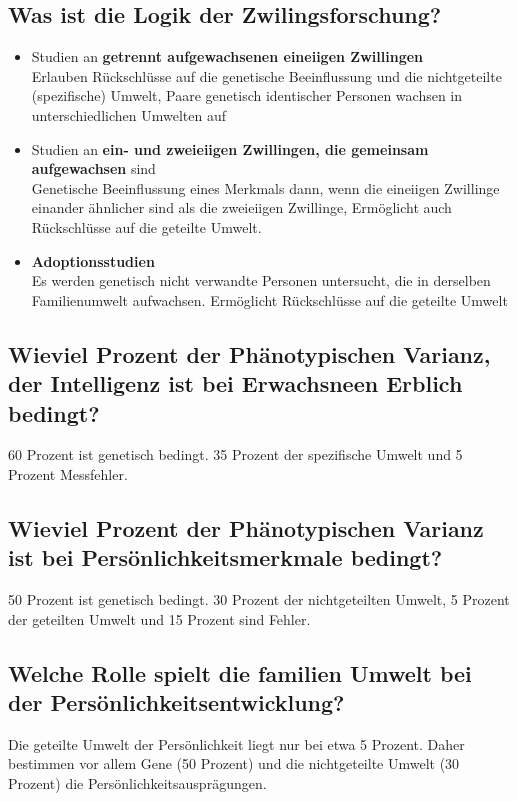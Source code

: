\documentclass[a6paper,10pt,DIV=40]{scrartcl}
\begin{document}
\subsection{Was ist die Logik der Zwilingsforschung?}
\begin{itemize}
\item Studien an \textbf{getrennt aufgewachsenen eineiigen Zwillingen}\\
Erlauben Rückschlüsse auf die genetische Beeinflussung und die nichtgeteilte
(spezifische) Umwelt, Paare genetisch identischer Personen wachsen in unterschiedlichen Umwelten auf

\item Studien an \textbf{ein- und zweieiigen Zwillingen, die gemeinsam aufgewachsen} sind\\
Genetische Beeinflussung eines Merkmals dann, wenn die eineiigen Zwillinge einander ähnlicher sind als die zweieiigen Zwillinge, Ermöglicht auch Rückschlüsse auf die geteilte Umwelt.

\item \textbf{Adoptionsstudien}\\
Es werden genetisch nicht verwandte Personen untersucht, die in derselben
Familienumwelt aufwachsen. Ermöglicht Rückschlüsse auf die geteilte Umwelt
\end{itemize}
\subsection{Wieviel Prozent der Phänotypischen Varianz, der Intelligenz ist bei Erwachsneen Erblich bedingt?}
60 Prozent ist genetisch bedingt. 35 Prozent der spezifische Umwelt und 5 Prozent Messfehler.
\subsection{Wieviel Prozent der Phänotypischen Varianz ist bei Persönlichkeitsmerkmale bedingt?}
50 Prozent ist genetisch bedingt. 30 Prozent der nichtgeteilten Umwelt, 5 Prozent der geteilten Umwelt und 15 Prozent sind Fehler.
\subsection{Welche Rolle spielt die familien Umwelt bei der Persönlichkeitsentwicklung?}
Die geteilte Umwelt der Persönlichkeit liegt nur bei etwa 5 Prozent. Daher bestimmen vor allem Gene (50 Prozent) und die nichtgeteilte Umwelt (30 Prozent) die Persönlichkeitsausprägungen.
    

\end{document}
